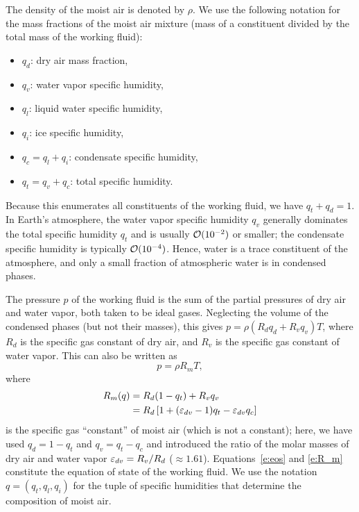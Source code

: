 \documentclass{report}
\begin{document}
The density of the moist air is denoted by $\rho$. We use the following notation for the mass fractions of the moist air mixture (mass of a constituent divided by the total mass of the working fluid):
\begin{itemize}
\item $q_d$: dry air mass fraction,
\item $q_v$: water vapor specific humidity,
\item $q_l$: liquid water specific humidity,
\item $q_i$: ice specific humidity,
\item $q_c = q_l + q_i$: condensate specific humidity,
\item $q_t = q_v + q_c$: total specific humidity.
\end{itemize}
Because this enumerates all constituents of the working fluid, we have $q_t + q_d = 1$. In Earth's atmosphere, the water vapor specific humidity $q_v$ generally dominates the total specific humidity $q_t$ and is usually $\mathcal{O}(10^{-2})$ or smaller; the condensate specific humidity is typically $\mathcal{O}(10^{-4})$. Hence, water is a trace constituent of the atmosphere, and only a small fraction of atmospheric water is in condensed phases. 

The pressure $p$ of the working fluid is the sum of the partial pressures of dry air and water vapor, both taken to be ideal gases. Neglecting the volume of the condensed phases (but not their masses), this gives $p = \rho (R_d q_d + R_v q_v) T$, where $R_d$ is the specific gas constant of dry air, and $R_v$ is the specific gas constant of water vapor. This can also be written as
\begin{equation}
    p = \rho R_m T,
\label{e:eos}
\end{equation}
where
\begin{equation}
\begin{split}
    R_m(q) & = R_d (1 - q_t) + R_v q_v \\
        & = R_d \left[1 + (\varepsilon_{dv}-1)q_t - \varepsilon_{dv} q_c\right]
\label{e:R_m}
\end{split}
\end{equation}
is the specific gas ``constant'' of moist air (which is not a constant); here, we have used $q_d = 1-q_t$ and $q_v = q_t - q_c$ and introduced the ratio of the molar masses of dry air and water vapor $\varepsilon_{dv} = R_v/R_d$ ($\approx 1.61$). Equations~\eqref{e:eos} and \eqref{e:R_m} constitute the equation of state of the working fluid. We use the notation $q=(q_t, q_l, q_i)$ for the tuple of specific humidities that determine the composition of moist air.
\end{document}
